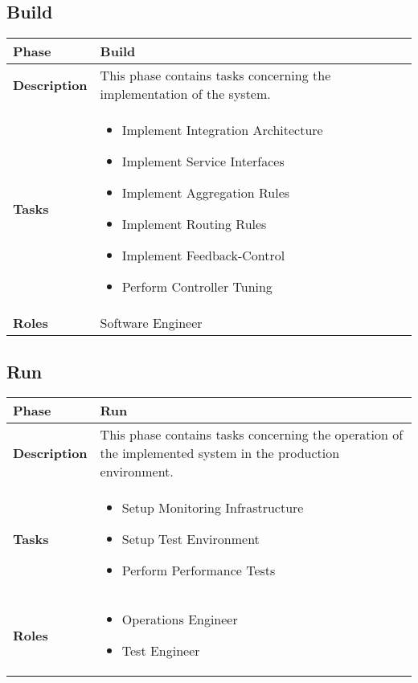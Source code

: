 \subsection{Build}
\begin{tabularx}{\textwidth}{@{} l X @{}}
	\caption{Phase: Build}\label{table:ch6_View_Build}\\
	\toprule
	\bfseries Phase & Build\\
	\midrule 
	\bfseries Description & This phase contains tasks concerning the implementation of the system.\\
	\midrule 
	\bfseries Tasks & 
	\begin{itemize}
		\item Implement Integration Architecture
		\item Implement Service Interfaces
		\item Implement Aggregation Rules
		\item Implement Routing Rules
		\item Implement Feedback-Control	
		\item Perform Controller Tuning
	\end{itemize}
	\\
	\midrule
	\bfseries Roles & Software Engineer
	\\
	\bottomrule
\end{tabularx}


\subsection{Run}
\begin{tabularx}{\textwidth}{@{} l X @{}}
	\caption{Phase: Run}\label{table:ch6_View_Run}\\
	\toprule
	\bfseries Phase & Run\\
	\midrule 
	\bfseries Description & This phase contains tasks concerning the operation of the implemented system in the production environment. \\
	\midrule 
	\bfseries Tasks & 
	\begin{itemize}
		\item Setup Monitoring Infrastructure
		\item Setup Test Environment
		\item Perform Performance Tests
	\end{itemize}
	\\
	\midrule 
	\bfseries Roles &
	\begin{itemize}
		\item Operations Engineer
		\item Test Engineer
	\end{itemize}
	\\
	\bottomrule 
\end{tabularx}

